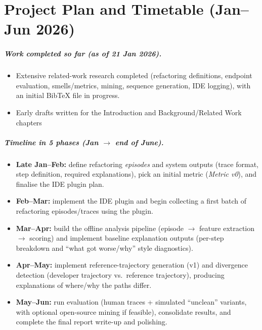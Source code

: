 \chapter{Project Plan and Timetable (Jan--Jun 2026)}
\label{ch:plan}

\paragraph{Work completed so far (as of 21 Jan 2026).}
\begin{itemize}
  \item Extensive related-work research completed (refactoring definitions, endpoint evaluation, smells/metrics, mining, sequence generation, IDE logging), with an initial Bib\TeX{} file in progress.
  \item Early drafts written for the Introduction and Background/Related Work chapters
\end{itemize}

\paragraph{Timeline in 5 phases (Jan $\rightarrow$ end of June).}
\begin{itemize}
  \item \textbf{Late Jan--Feb:} define refactoring \emph{episodes} and system outputs (trace format, step definition, required explanations), pick an initial metric (\emph{Metric v0}), and finalise the IDE plugin plan.
  \item \textbf{Feb--Mar:} implement the IDE plugin and begin collecting a first batch of refactoring episodes/traces using the plugin.
  \item \textbf{Mar--Apr:} build the offline analysis pipeline (episode $\rightarrow$ feature extraction $\rightarrow$ scoring) and implement baseline explanation outputs (per-step breakdown and ``what got worse/why'' style diagnostics).
  \item \textbf{Apr--May:} implement reference-trajectory generation (v1) and divergence detection (developer trajectory vs.\ reference trajectory), producing explanations of where/why the paths differ.
  \item \textbf{May--Jun:} run evaluation (human traces + simulated ``unclean'' variants, with optional open-source mining if feasible), consolidate results, and complete the final report write-up and polishing.
\end{itemize}
